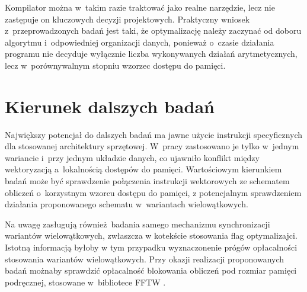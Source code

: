 Kompilator można w~takim razie traktować jako realne narzędzie, lecz nie
zastępuje on kluczowych decyzji projektowych. Praktyczny wniosek
z~przeprowadzonych badań jest taki, że optymalizację należy zaczynać od doboru
algorytmu i~odpowiedniej organizacji danych, ponieważ o~czasie działania
programu nie decyduje wyłącznie liczba wykonywanych działań arytmetycznych,
lecz w~porównywalnym stopniu wzorzec dostępu do pamięci.

\section{Kierunek dalszych badań}
Największy potencjał do dalszych badań ma jawne użycie instrukcji specyficznych
dla stosowanej architektury sprzętowej. W~pracy zastosowano je tylko w~jednym wariancie i~przy jednym
układzie danych, co ujawniło konflikt między wektoryzacją a~lokalnością dostępów do pamięci.
Wartościowym kierunkiem badań może być sprawdzenie połączenia instrukcji wektorowych ze schematem
obliczeń o~korzystnym wzorcu dostępu do pamięci, z potencjalnym sprawdzeniem działania proponowanego schematu 
w~wariantach wielowątkowych.

Na uwagę zasługują również badania samego mechanizmu 
synchronizacji wariantów wielowątkowych, zwłaszcza w kotekście stosowania flag optymalizajci. Istotną informacją byłoby w tym przypadku
 wyznaczonenie prógów opłacalności stosowania wariantów wielowątkowych. Przy okazji realizacji proponowanych badań możnaby sprawdzić opłacalność blokowania obliczeń pod
rozmiar pamięci podręcznej, stosowane w~bibliotece FFTW \cite{FFTWPaper}.